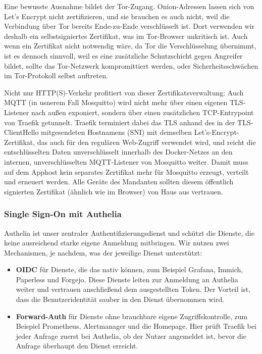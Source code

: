 Eine bewusste Ausnahme bildet der Tor-Zugang. Onion-Adressen lassen sich von
Let's Encrypt nicht zertifizieren, und sie brauchen es auch nicht, weil die
Verbindung über Tor bereits Ende-zu-Ende verschlüsselt ist. Dort verwenden wir
deshalb ein selbstsigniertes Zertifikat, was im Tor-Browser unkritisch ist.
Auch wenn ein Zertifikat nicht notwendig wäre, da Tor die Verschlüsselung übernimmt, ist es dennoch sinnvoll, weil es eine zusätzliche Schutzschicht gegen Angreifer bildet, sollte das Tor-Netzwerk kompromittiert werden, oder Sicherheitsschwächen im Tor-Protokoll selbst auftreten.

Nicht nur \ac{HTTP}(S)-Verkehr profitiert von dieser Zertifikatsverwaltung: Auch
\ac{MQTT} (in usnerem Fall Mosquitto) wird nicht mehr über einen eigenen \ac{TLS}-Listener nach außen exponiert, sondern über einen
zusätzlichen \ac{TCP}-Entrypoint von Traefik getunnelt. Traefik
terminiert dabei das \ac{TLS} anhand des in der \ac{TLS}-ClientHello
mitgesendeten Hostnamens (\ac{SNI}) mit demselben Let's-Encrypt-Zertifikat, das
auch für den regulären Web-Zugriff verwendet wird, und reicht die entschlüsselten
Daten unverschlüsselt innerhalb des Docker-Netzes an den internen,
unverschlüsselten \ac{MQTT}-Listener von Mosquitto weiter. Damit muss auf dem
Apphost kein separates Zertifikat mehr für Mosquitto erzeugt, verteilt und
erneuert werden. Alle Geräte des Mandanten sollten diesem öffentlich signierten
Zertifikat (ähnlich wie im Browser) von Haus aus vertrauen.

\subsubsection{Single Sign-On mit Authelia}
\label{sec:apphost-authelia}
Authelia ist unser zentraler Authentifizierungsdienst und schützt die Dienste,
die keine ausreichend starke eigene Anmeldung mitbringen. Wir nutzen zwei
Mechanismen, je nachdem, was der jeweilige Dienst unterstützt:

\begin{itemize}
  \item \textbf{\ac{OIDC}} für Dienste, die das nativ können, zum
    Beispiel Grafana, Immich, Paperless und Forgejo. Diese Dienste leiten zur
    Anmeldung an Authelia weiter und vertrauen anschließend dem ausgestellten
    Token. Der Vorteil ist, dass die Benutzeridentität sauber in den Dienst
    übernommen wird.
  \item \textbf{Forward-Auth} für Dienste ohne brauchbare eigene
    Zugriffskontrolle, zum Beispiel Prometheus, Alertmanager und die Homepage.
    Hier prüft Traefik bei jeder Anfrage zuerst bei Authelia, ob der Nutzer
    angemeldet ist, bevor die Anfrage überhaupt den Dienst erreicht.
\end{itemize}


